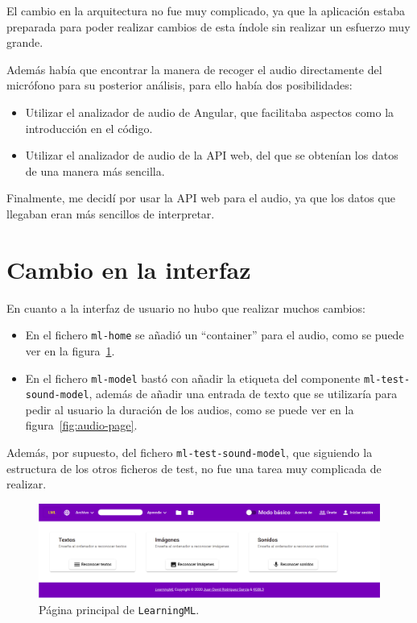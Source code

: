\documentclass[a4paper, 12pt]{book}
\begin{document}
El cambio en la arquitectura no fue muy complicado, ya que la aplicación estaba preparada para poder realizar cambios de esta índole sin realizar un esfuerzo muy grande.

Además había que encontrar la manera de recoger el audio directamente del micrófono para su posterior análisis, para ello había dos posibilidades:
\begin{itemize}
	\item Utilizar el analizador de audio de Angular, que facilitaba aspectos como la introducción en el código.
	\item Utilizar el analizador de audio de la API web, del que se obtenían los datos de una manera más sencilla.
\end{itemize}

Finalmente, me decidí por usar la API web para el audio, ya que los datos que llegaban eran más sencillos de interpretar.

\section{Cambio en la interfaz}
\label{sec:cambio-interfaz}

En cuanto a la interfaz de usuario no hubo que realizar muchos cambios:
\begin{itemize}
	\item En el fichero \texttt{ml-home} se añadió un ``container'' para el audio, como se puede ver en la figura~\ref{fig:main-page}.
	\item En el fichero \texttt{ml-model} bastó con añadir la etiqueta del componente \texttt{ml-test-sound-model}, además de añadir una entrada de texto que se utilizaría para pedir al usuario la duración de los audios, como se puede ver en la figura~\ref{fig:audio-page}.
\end{itemize}

Además, por supuesto, del fichero \texttt{ml-test-sound-model}, que siguiendo la estructura de los otros ficheros de test, no fue una tarea muy complicada de realizar.

\begin{figure}
	\centering
	\includegraphics[width=15cm, keepaspectratio]{img/pagina-principal.png}
	\caption{Página principal de \texttt{LearningML}.}\label{fig:main-page}
\end{figure}
\end{document}
